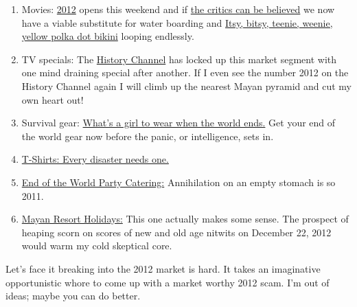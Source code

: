 \begin{enumerate}
\item
  Movies: \href{http://www.whowillsurvive2012.com/}{2012} opens this
  weekend and if \href{http://www.rottentomatoes.com/m/2012/}{the
  critics can be believed} we now have a viable substitute for water
  boarding and
  \href{http://www.flickr.com/photos/neloqua/294329338/}{Itsy, bitsy,
  teenie, weenie, yellow polka dot bikini} looping endlessly.
\item
  TV specials: The
  \href{http://boards.history.com/topic/History-Now/History-Channels-2012/520029478}{History
  Channel} has locked up this market segment with one mind draining
  special after another. If I even see the number 2012 on the History
  Channel again I will climb up the nearest Mayan pyramid and cut my own
  heart out!
\item
  Survival gear:
  \href{http://2012base.com/Products\_and\_Merchandise/Survival\_Equipment/}{What's
  a girl to wear when the world ends.} Get your end of the world gear
  now before the panic, or intelligence, sets in.
\item
  \href{http://t-shirts.cafepress.com/2012?cmp=knc--g--us--pol--apparel--search-e--2012\_tee\_shirts\&utm\_medium=cpc\&utm\_source=google\&utm\_campaign=pol--apparel\&utm\_content=search-e\&utm\_term=2012\_tee\_shirts}{T-Shirts:
  Every disaster needs one.}
\item
  \href{http://www.associatedcontent.com/article/1818574/how\_to\_throw\_a\_december\_21\_2012\_end.html?cat=60}{End
  of the World Party Catering:} Annihilation on an empty stomach is so
  2011.
\item
  \href{http://www.exploringlifesmysteries.com/2012-planetary-alignment}{Mayan
  Resort Holidays:} This one actually makes some sense. The prospect of
  heaping scorn on scores of new and old age nitwits on December 22,
  2012 would warm my cold skeptical core.
\end{enumerate}
Let's face it breaking into the 2012 market is hard. It takes an
imaginative opportunistic whore to come up with a market worthy 2012
scam. I'm out of ideas; maybe you can do better.



%